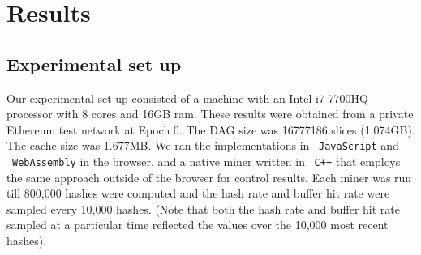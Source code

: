 \documentclass[runningheads]{llncs}
\begin{document}

\section{Results}
\subsection{Experimental set up}
Our experimental set up consisted of a machine with an Intel i7-7700HQ processor with 8 cores and 16GB ram. These results were obtained from a private Ethereum test network at Epoch 0. The DAG size was 16777186 slices (1.074GB). The cache size was 1.677MB. We ran the implementations in ~\verb|JavaScript| and ~\verb|WebAssembly| in the browser, and a native miner written in ~\verb|C++| that employs the same approach outside of the browser for control results. Each miner was run till 800,000 hashes were computed and the hash rate and buffer hit rate were sampled every 10,000 hashes. (Note that both the hash rate and buffer hit rate sampled at a particular time reflected the values over the 10,000 most recent hashes).



\end{document}
